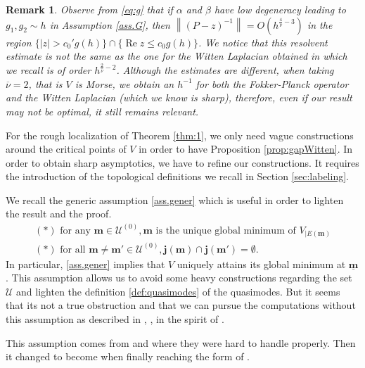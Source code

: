 \documentclass[12pt]{amsart}
\renewcommand{\Re}{\operatorname{Re}}
\numberwithin{equation}{section}
\numberwithin{figure}{section}
\def\m{\mathbf{m}}
\def\j{\mathbf{j}}
\def\um{\underline{\m}}
\newcommand{\vvert}[1]{\left\lVert#1\right\rVert}
\newtheorem{remark}[defin]{Remark}
\def\uuu{{\mathcal U}}\def\vvv{{\mathcal V}}\def\www{{\mathcal W}}\def\xxx{{\mathcal X}}
\begin{document}
\begin{remark}
    Observe from \eqref{eq:g} that if $\alpha$ and $\beta$ have low degeneracy leading to $g_1,g_2\sim h$ in Assumption \ref{ass.G}, then $\vvert{(P-z)^{-1}} = O(h^{\frac{4}{\overline{\nu}}-3})$ in the region $\{|z|>c_0'g(h)\}\cap\{\Re z\leq c_0g(h)\}$. We notice that this resolvent estimate is not the same as the one for the Witten Laplacian obtained in \cite{De25_1} which we recall is of order $h^{\frac{2}{\overline{\nu}}-2}$. Although the estimates are different, when taking $\overline{\nu} = 2$, that is $V$ is Morse, we obtain an $h^{-1}$ for both the Fokker-Planck operator and the Witten Laplacian (which we know is sharp), therefore, even if our result may not be optimal, it still remains relevant.
\end{remark}

For the rough localization of Theorem \ref{thm:1}, we only need vague constructions around the critical points of $V$ in order to have Proposition \ref{prop:gapWitten}. In order to obtain sharp asymptotics, we have to refine our constructions. It requires the introduction of the topological definitions we recall in Section \ref{sec:labeling}.

We recall the generic assumption \eqref{ass.gener} which is useful in order to lighten the result and the proof.
\begin{equation}\label{ass.gener}\tag{Gener}
\begin{array}{l}
    (\ast)\mbox{ for any }\m\in\uuu^{(0)},\m \mbox{ is the unique global minimum of } V_{|E(\m)}\\
    (\ast)\mbox{ for all }\m\neq\m'\in\uuu^{(0)},\j(\m)\cap\j(\m')=\emptyset.
\end{array}
\end{equation}
In particular, \eqref{ass.gener} implies that $V$ uniquely attains its global minimum at $\um$. This assumption allows us to avoid some heavy constructions regarding the set $\uuu$ and lighten the definition \ref{def:quasimodes} of the quasimodes. But it seems that its not a true obstruction and that we can pursue the computations without this assumption as described in \cite[Section 6]{BoLePMi22}, \cite{No24}, in the spirit of \cite{Mi19}.

This assumption comes from \cite[(1.7)]{BoGaKl05_01} and \cite[Assumption 3.8]{HeKlNi04_01} where they were hard to handle properly. Then it changed to become \cite[Hypothesis 5.1]{HeHiSj11_01} when finally reaching the form of \cite[Assumption 4]{LePMi20}.
\end{document}
